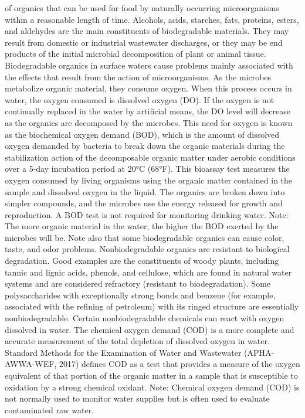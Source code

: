 \documentclass{article}
\begin{document}
of organics that can be used for food by naturally occurring
microorganisms within a reasonable length of time. Alcohols, acids,
starches, fats, proteins, esters, and aldehydes are the main
constituents of biodegradable materials. They may result from domestic
or industrial wastewater discharges, or they may be end products of the
initial microbial decomposition of plant or animal tissue. Biodegradable
organics in surface waters cause problems mainly associated with the
effects that result from the action of microorganisms. As the microbes
metabolize organic material, they consume oxygen. When this process
occurs in water, the oxygen consumed is dissolved oxygen (DO). If the
oxygen is not continually replaced in the water by artificial means, the
DO level will decrease as the organics are decomposed by the microbes.
This need for oxygen is known as the biochemical oxygen demand (BOD),
which is the amount of dissolved oxygen demanded by bacteria to break
down the organic materials during the stabilization action of the
decomposable organic matter under aerobic conditions over a 5-day
incubation period at 20°C (68°F). This bioassay test measures the oxygen
consumed by living organisms using the organic matter contained in the
sample and dissolved oxygen in the liquid. The organics are broken down
into simpler compounds, and the microbes use the energy released for
growth and reproduction. A BOD test is not required for monitoring
drinking water. Note: The more organic material in the water, the higher
the BOD exerted by the microbes will be. Note also that some
biodegradable organics can cause color, taste, and odor problems.
Nonbiodegradable organics are resistant to biological degradation. Good
examples are the constituents of woody plants, including tannic and
lignic acids, phenols, and cellulose, which are found in natural water
systems and are considered refractory (resistant to biodegradation).
Some polysaccharides with exceptionally strong bonds and benzene (for
example, associated with the refining of petroleum) with its ringed
structure are essentially nonbiodegradable. Certain nonbiodegradable
chemicals can react with oxygen dissolved in water. The chemical oxygen
demand (COD) is a more complete and accurate measurement of the total
depletion of dissolved oxygen in water. Standard Methods for the
Examination of Water and Wastewater (APHA-AWWA-WEF, 2017) defines COD as
a test that provides a measure of the oxygen equivalent of that portion
of the organic matter in a sample that is susceptible to oxidation by a
strong chemical oxidant. Note: Chemical oxygen demand (COD) is not
normally used to monitor water supplies but is often used to evaluate
contaminated raw water.
\end{document}
